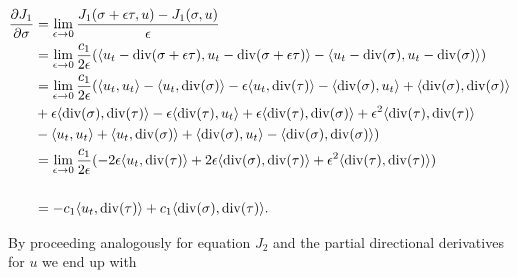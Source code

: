 \documentclass[../draft_1.tex]{subfiles}
\begin{document}
\begin{equation}
\begin{aligned}
\frac{\partial J_1}{\partial \sigma} &= \lim_{\epsilon \rightarrow 0} \frac{J_1(\sigma + \epsilon \tau, u) - J_1(\sigma, u)}{\epsilon}  \\ 
&= \lim_{\epsilon \rightarrow 0} \frac{c_1}{2 \epsilon} (\langle u_t - \di(\sigma + \epsilon \tau), u_t - \di(\sigma + \epsilon \tau) \rangle - \langle u_t - \di(\sigma), u_t - \di(\sigma) \rangle) \\
&=  \lim_{\epsilon \rightarrow 0} \frac{c_1}{2 \epsilon} (\langle u_t, u_t \rangle - \langle u_t, \di(\sigma) \rangle - \epsilon \langle u_t, \di(\tau) \rangle - \langle \di(\sigma), u_t \rangle + \langle \di(\sigma), \di(\sigma) \rangle \\ &+ \epsilon \langle \di(\sigma), \di(\tau) \rangle - \epsilon \langle \di(\tau), u_t \rangle + \epsilon \langle \di(\tau), \di(\sigma) \rangle + \epsilon^2 \langle \di(\tau), \di(\tau) \rangle \\
& - \langle u_t, u_t \rangle + \langle u_t, \di(\sigma) \rangle + \langle \di(\sigma), u_t \rangle - \langle \di(\sigma), \di(\sigma) \rangle) \\
&= \lim_{\epsilon \rightarrow 0} \frac{c_1}{2 \epsilon} (- 2 \epsilon \langle u_t, \di(\tau) \rangle + 2 \epsilon \langle \di(\sigma), \di(\tau) \rangle + \epsilon^2 \langle \di(\tau), \di(\tau) \rangle )
\\
\\
&= - c_1 \langle u_t, \di(\tau) \rangle + c_1 \langle \di(\sigma), \di(\tau) \rangle.
\end{aligned}
\end{equation}

By proceeding analogously for equation $J_2$ and the partial directional derivatives for $u$ we end up with
\end{document}
